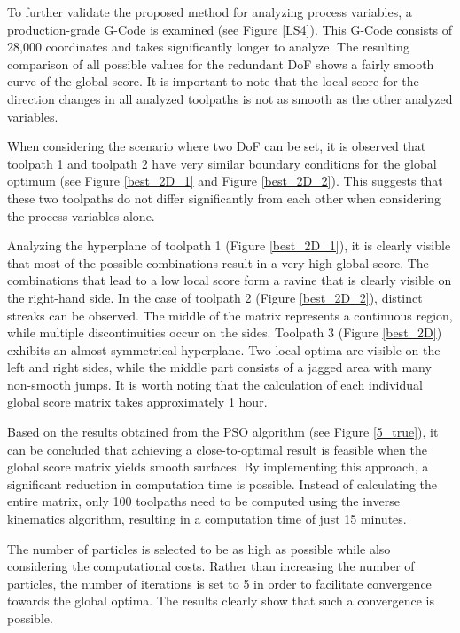To further validate the proposed method for analyzing process variables, a production-grade G-Code is examined (see Figure \ref{LS4}). This G-Code consists of 28,000 coordinates and takes significantly longer to analyze. The resulting comparison of all possible values for the redundant \acrshort{DoF} shows a fairly smooth curve of the global score. It is important to note that the local score for the direction changes in all analyzed toolpaths is not as smooth as the other analyzed variables.


When considering the scenario where two \acrshort{DoF} can be set, it is observed that toolpath 1 and toolpath 2 have very similar boundary conditions for the global optimum (see Figure \ref{best_2D_1} and Figure \ref{best_2D_2}). This suggests that these two toolpaths do not differ significantly from each other when considering the process variables alone. 

Analyzing the hyperplane of toolpath 1 (Figure \ref{best_2D_1}), it is clearly visible that most of the possible combinations result in a very high global score. The combinations that lead to a low local score form a ravine that is clearly visible on the right-hand side. In the case of toolpath 2 (Figure \ref{best_2D_2}), distinct streaks can be observed. The middle of the matrix represents a continuous region, while multiple discontinuities occur on the sides. Toolpath 3 (Figure \ref{best_2D}) exhibits an almost symmetrical hyperplane. Two local optima are visible on the left and right sides, while the middle part consists of a jagged area with many non-smooth jumps. It is worth noting that the calculation of each individual global score matrix takes approximately 1 hour.


Based on the results obtained from the \acrshort{PSO} algorithm (see Figure \ref{5_true}), it can be concluded that achieving a close-to-optimal result is feasible when the global score matrix yields smooth surfaces. By implementing this approach, a significant reduction in computation time is possible. Instead of calculating the entire matrix, only 100 toolpaths need to be computed using the inverse kinematics algorithm, resulting in a computation time of just 15 minutes.

The number of particles is selected to be as high as possible while also considering the computational costs. Rather than increasing the number of particles, the number of iterations is set to 5 in order to facilitate convergence towards the global optima. The results clearly show that such a convergence is possible.


